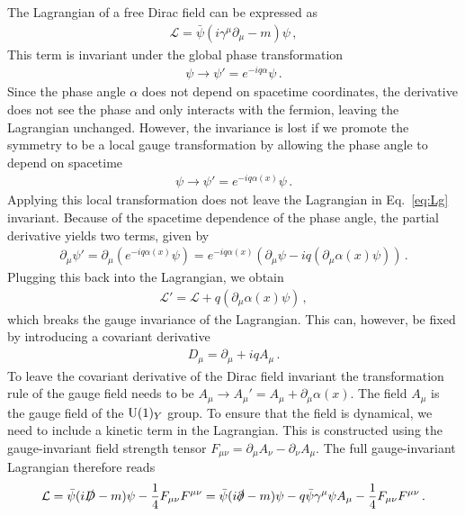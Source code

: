 The Lagrangian of a free Dirac field can be expressed as
\begin{align}
    \mathcal{L}=\bar\psi(i\gamma^\mu\partial_\mu-m)\psi\,,\label{eq:Lg}
\end{align}
This term is invariant under the global phase transformation
\begin{align}
    \psi\to\psi'=e^{-iq\alpha}\psi\,.
\end{align}
Since the phase angle $\alpha$ does not depend on spacetime coordinates, the derivative does not see the phase and only interacts with the fermion, leaving the Lagrangian unchanged. However, the invariance is lost if we promote the symmetry to be a local gauge transformation by allowing the phase angle to depend on spacetime
\begin{align}
    \psi\to\psi'=e^{-iq\alpha(x)}\psi\,.
\end{align}
Applying this local transformation does not leave the Lagrangian in Eq.~\eqref{eq:Lg} invariant. Because of the spacetime dependence of the phase angle, the partial derivative yields two terms, given by
\begin{align}
    \partial_\mu \psi'=\partial_\mu\left(e^{-iq\alpha(x)}\psi\right)=e^{-iq\alpha(x)}\left(\partial_\mu\psi-iq(\partial_\mu \alpha(x)\psi)\right)\,.
\end{align}
Plugging this back into the Lagrangian, we obtain
\begin{align}
    \mathcal{L}'=\mathcal{L}+q(\partial_\mu \alpha(x)\psi)\,,
\end{align}
which breaks the gauge invariance of the Lagrangian. This can, however, be fixed by introducing a covariant derivative
\begin{align}
    D_\mu=\partial_\mu+iqA_\mu \,.\label{eq:Atrans}
\end{align}
To leave the covariant derivative of the Dirac field invariant the transformation rule of the gauge field needs to be $A_\mu\to A_\mu'=A_\mu+\partial_\mu\alpha(x)$. The field $A_\mu$ is the gauge field of the $\mathrm{U}(1)_Y$ group. To ensure that the field is dynamical, we need to include a kinetic term in the Lagrangian. This is constructed using the gauge-invariant field strength tensor $F_{\mu\nu}=\partial_\mu A_\nu-\partial_\nu A_\mu$. The full gauge-invariant Lagrangian therefore reads 
\begin{align}
    \mathcal{L} = \bar{\psi}(i\slashed{D} - m)\psi - \frac{1}{4}F_{\mu\nu}F^{\mu\nu} = \bar{\psi}(i\slashed{\partial} - m)\psi - q\bar{\psi}\gamma^\mu\psi A_\mu-\frac{1}{4}F_{\mu\nu}F^{\mu\nu}\,.
\end{align}
